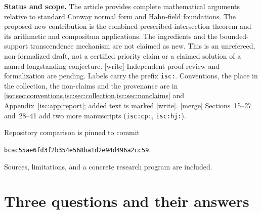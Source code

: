 \documentclass[11pt,letterpaper]{article}
\theoremstyle{definition}
\theoremstyle{remark}
\newcommand{\R}{\mathbb R}
\newcommand{\Q}{\mathbb Q}
\newcommand{\snapshot}{\texttt{bcac55ae6fd3f2b354e568ba1d2e94d496a2cc59}}
\newcommand{\wtag}{\textup{[write]}}%
\newcommand{\mtag}{\textup{[merge]}}%
\numberwithin{equation}{section}
\begin{document}
\begin{titlepage}
\begin{abstract}
The proof combines a cut-realization lemma that avoids an arbitrary set of
previously chosen values with a coset-slice criterion for linear disjointness
of full Hahn fields. It yields exact Boolean meet diagrams and descent of
all polynomial relations across their squares. Two consequences distinguish
this construction from mere universality. First, the fraction field of the
intersection of two full omnific copies is a proper subfield of their common
field, with a transcendental gap for every set-sized $H$. For $H=\Q$ a
witness is $1+\sum_{n\ge1}\omega^{-n!}$; real constants already belong to the
smaller fraction field. Second, explicit independent copies with intersection
$\R$ have a full Hahn join containing an explicitly described series
transcendental over their ordinary compositum. Both obstructions persist
on complexification.
\end{abstract}
\vfill
\noindent\textbf{Status and scope.} The article provides complete mathematical
arguments relative to standard Conway normal form and Hahn-field foundations.
The proposed new contribution is the combined prescribed-intersection theorem
and its arithmetic and compositum applications. The ingredients and the
bounded-support transcendence mechanism are not claimed as new. This is an
unrefereed, non-formalized draft, not a certified priority claim or a claimed
solution of a named longstanding conjecture.
\wtag{} Independent proof review and formalization are pending. Labels
carry the prefix \texttt{isc:}. Conventions, the place in the collection,
the non-claims and the provenance are in
\cref{isc:sec:conventions,isc:sec:collection,isc:sec:nonclaims} and
Appendix~\ref{isc:app:report}; added text is marked \wtag.
\mtag{} Sections~15--27 and~28--41 add two more manuscripts
(\texttt{isc:cp:}, \texttt{isc:hj:}).

\smallskip
\noindent\small Repository comparison is pinned to commit\par
\noindent\small\snapshot.\par
\noindent\small Sources, limitations, and a concrete research program are included.
\end{titlepage}
\hypersetup{pageanchor=true}
\setcounter{page}{1}
{\small\setlength{\parskip}{0pt}\tableofcontents}
\clearpage

\section{Three questions and their answers}\label{isc:sec:introduction}
\end{document}
